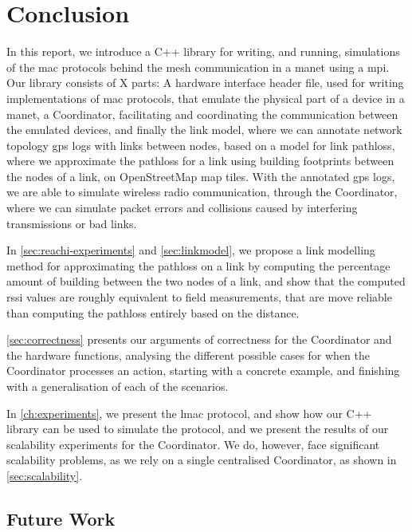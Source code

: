 \chapter{Conclusion}\label{ch:conclusion}
In this report, we introduce a C++ library for writing, and running, simulations of the \gls{mac} protocols
behind the mesh communication in a \gls{manet} using a \gls{mpi}. Our library consists of X parts: A hardware
interface header file, used for writing implementations of \gls{mac} protocols, that emulate the physical part
of a device in a \gls{manet}, a Coordinator, facilitating and coordinating the communication between the
emulated devices, and finally the link model, where we can annotate network topology \gls{gps} logs with links
between nodes, based on a model for link \gls{pathloss}, where we approximate the \gls{pathloss} for a link
using building footprints between the nodes of a link, on OpenStreetMap map tiles. With the annotated
\gls{gps} logs, we are able to simulate wireless radio communication, through the Coordinator, where we can
simulate packet errors and collisions caused by interfering transmissions or bad links. \smallbreak

In \autoref{sec:reachi-experiments} and \autoref{sec:linkmodel}, we propose a link modelling method for
approximating the \gls{pathloss} on a link by computing the percentage amount of building between the two
nodes of a link, and show that the computed \gls{rssi} values are roughly equivalent to field measurements,
that are move reliable than computing the \gls{pathloss} entirely based on the distance. \smallbreak

\autoref{sec:correctness} presents our arguments of correctness for the Coordinator and the hardware
functions, analysing the different possible cases for when the Coordinator processes an action, starting with 
a concrete example, and finishing with a generalisation of each of the scenarios. \smallbreak

In \autoref{ch:experiments}, we present the \gls{lmac} protocol, and show how our C++ library can be used to
simulate the protocol, and we present the results of our scalability experiments for the Coordinator. We do,
however, face significant scalability problems, as we rely on a single centralised Coordinator, as shown in
\autoref{sec:scalability}.


\section{Future Work}
